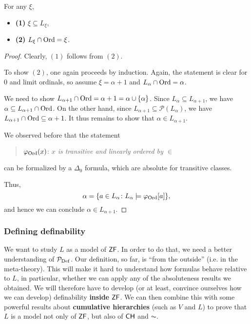 \begin{proposition}For any $\xi$,

\begin{itemize}
\item \textbf{(1)} $\xi \subseteq L_\xi$,
\item \textbf{(2)} $L_\xi \cap \operatorname{Ord} = \xi$.
\end{itemize}

\end{proposition}\begin{proof}Clearly, $(1)$ follows from $(2)$.

To show $(2)$, one again proceeds by induction. Again, the statement is clear for 0 and limit ordinals, so assume $\xi = \alpha +1$ and $L_\alpha \cap \operatorname{Ord} = \alpha$.

We need to show $L_{\alpha + 1} \cap \operatorname{Ord} = \alpha + 1 = \alpha \cup \{\alpha\}$. Since $L_\alpha \subseteq L_{\alpha + 1}$, we have $\alpha \subseteq L_{\alpha+1} \cap \operatorname{Ord}$. On the other hand, since $L_{\alpha+1} \subseteq \mathcal{P}(L_\alpha)$, we have $L_{\alpha+1} \cap \operatorname{Ord} \subseteq \alpha + 1$. It thus remains to show that $\alpha \in L_{\alpha+1}$.

We observed before that the statement

\begin{quote}
$\varphi_{\operatorname{Ord}}(x)$: \textit{$x$ is transitive and linearly ordered by $\in$}
\end{quote}

can be formalized by a $\Delta_0$ formula, which are absolute for transitive classes.

Thus,
\begin{equation*}
\alpha = \{ a \in L_\alpha \colon L_\alpha \models \varphi_{\operatorname{Ord}}[a] \},
\end{equation*}
and hence we can conclude $\alpha \in L_{\alpha+1}$.

\end{proof}\subsubsection{Defining definability}

We want to study $L$ as a model of $\mathsf{ZF}$. In order to do that, we need a better understanding of $\mathcal{P}_{\operatorname{Def}}$. Our definition, so far, is ``from the outside'' (i.e. in the meta-theory). This will make it hard to understand how formulas behave relative to $L$, in particular, whether we can apply any of the absoluteness results we obtained. We will therefore have to develop (or at least, convince ourselves how we can develop) definability  \textbf{inside} $\mathsf{ZF}$. We can then combine this with some powerful results about \textbf{cumulative hierarchies} (such as $V$ and $L$) to prove that $L$ is a model not only of $\mathsf{ZF}$, but also of $\mathsf{CH}$ and $\AC$.

